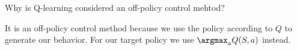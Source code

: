 
\begin{exercise}

Why is Q-learning considered an off-policy control mehtod?

\end{exercise}


\begin{solution}

It is an off-policy control method because we use the policy according to $Q$ to generate our behavior. For our target policy we use $\argmax_a Q(S,a)$ instead.

\end{solution}

